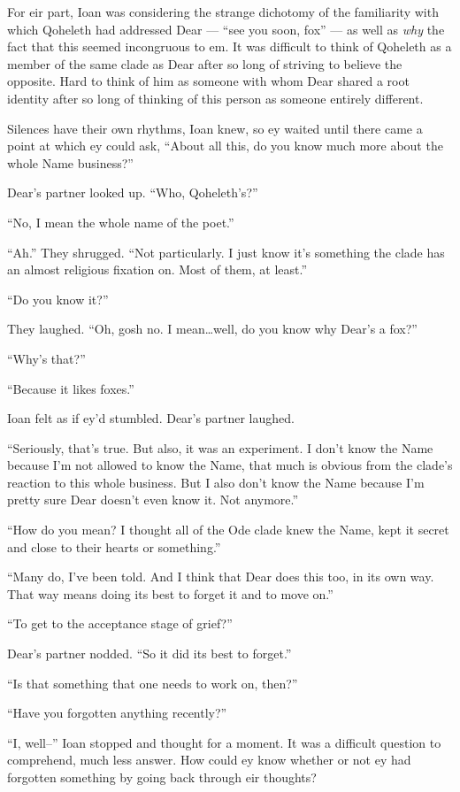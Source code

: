 For eir part, Ioan was considering the strange dichotomy of the familiarity with which Qoheleth had addressed Dear — ``see you soon, fox'' — as well as \emph{why} the fact that this seemed incongruous to em. It was difficult to think of Qoheleth as a member of the same clade as Dear after so long of striving to believe the opposite. Hard to think of him as someone with whom Dear shared a root identity after so long of thinking of this person as someone entirely different.

Silences have their own rhythms, Ioan knew, so ey waited until there came a point at which ey could ask, ``About all this, do you know much more about the whole Name business?''

Dear's partner looked up. ``Who, Qoheleth's?''

``No, I mean the whole name of the poet.''

``Ah.'' They shrugged. ``Not particularly. I just know it's something the clade has an almost religious fixation on. Most of them, at least.''

``Do you know it?''

They laughed. ``Oh, gosh no. I mean\ldots{}well, do you know why Dear's a fox?''

``Why's that?''

``Because it likes foxes.''

Ioan felt as if ey'd stumbled. Dear's partner laughed.

``Seriously, that's true. But also, it was an experiment. I don't know the Name because I'm not allowed to know the Name, that much is obvious from the clade's reaction to this whole business. But I also don't know the Name because I'm pretty sure Dear doesn't even know it. Not anymore.''

``How do you mean? I thought all of the Ode clade knew the Name, kept it secret and close to their hearts or something.''

``Many do, I've been told. And I think that Dear does this too, in its own way. That way means doing its best to forget it and to move on.''

``To get to the acceptance stage of grief?''

Dear's partner nodded. ``So it did its best to forget.''

``Is that something that one needs to work on, then?''

``Have you forgotten anything recently?''

``I, well--'' Ioan stopped and thought for a moment. It was a difficult question to comprehend, much less answer. How could ey know whether or not ey had forgotten something by going back through eir thoughts?


